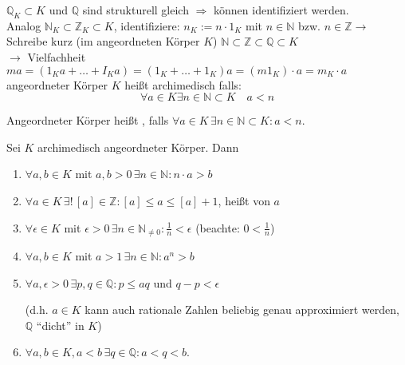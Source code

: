 \begin{*anmerkung}
	$\mathbb{Q}_K \subset K$ und $\mathbb{Q}$ sind strukturell gleich $\Rightarrow$ können identifiziert werden.\\
	Analog $\mathbb{N}_K \subset\mathbb{Z}_K \subset K$, identifiziere: $n_K := n\cdot 1_K$ mit $n \in \mathbb{N}$ bzw. $n \in \mathbb{Z} \rightarrow$ Schreibe kurz (im angeordneten Körper $K$) $\mathbb{N} \subset \mathbb{Z} \subset \mathbb{Q} \subset K$\\
	$\rightarrow$ Vielfachheit $ma = (1_Ka + \dots + I_K a) = (1_K + \dots + 1_K)a = (m 1_K)\cdot a = m_K \cdot a$\\
	angeordneter Körper $K$ heißt archimedisch falls: \[\forall a \in K \exists n \in \mathbb{N} \subset K\quad a < n\]
\end{*anmerkung}

\begin{*definition}
	Angeordneter Körper heißt , falls $\forall a\in K\,\exists n\in\mathbb{N}\subset K: a < n$.
\end{*definition}
\begin{proposition}
	Sei $K$ archimedisch angeordneter Körper. Dann\begin{enumerate}[label={\arabic*)}]
		\item $\forall a,b\in K$ mit $a,b>0\,\exists n\in\mathbb{N}: n\cdot a > b$
		\item $\forall a\in K\,\exists!\,[a]\in\mathbb{Z}: [a]\le a \le [a] +1$,  heißt  von $a$
		\item $\forall \epsilon \in K$ mit $\epsilon > 0\,\exists n\in\mathbb{N}_{\neq 0}: \frac{1}{n}< \epsilon$ (beachte: $0 < \frac{1}{n}$)
		\item $\forall a,b\in K$ mit $a>1\,\exists n\in\mathbb{N}: a^n > b$
		\item $\forall a,\epsilon > 0\,\exists p,q\in\mathbb{Q}: p \le a  q$ und $q - p < \epsilon$
		
		(d.h. $a\in K$ kann auch rationale Zahlen beliebig genau approximiert werden, $\mathbb{Q}$ "`dicht"' in $K$)
		\item $\forall a,b\in K, a < b\,\exists q\in\mathbb{Q}:a < q < b$.
	\end{enumerate}
\end{proposition}


